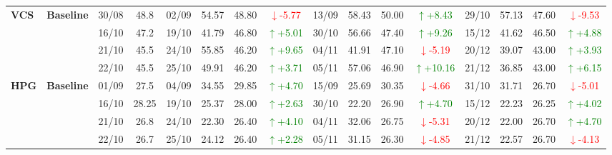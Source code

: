 {\begin{longtable}{llcc|cccc|cccc|cccc}
\multirow{4}{*}{\textbf{VCS}}
& \textbf{Baseline}
& 30/08 & 48.8 & 02/09 & 54.57 & 48.80 & \textcolor{red}{\(\downarrow\)-5.77} & 13/09 & 58.43 & 50.00 & \textcolor{green}{\(\uparrow\)+8.43} & 29/10 & 57.13 & 47.60 & \textcolor{red}{\(\downarrow\)-9.53} \\
& & 16/10 & 47.2 & 19/10 & 41.79 & 46.80 & \textcolor{green}{\(\uparrow\)+5.01} & 30/10 & 56.66 & 47.40 & \textcolor{green}{\(\uparrow\)+9.26} & 15/12 & 41.62 & 46.50 & \textcolor{green}{\(\uparrow\)+4.88} \\
& & 21/10 & 45.5 & 24/10 & 55.85 & 46.20 & \textcolor{green}{\(\uparrow\)+9.65} & 04/11 & 41.91 & 47.10 & \textcolor{red}{\(\downarrow\)-5.19} & 20/12 & 39.07 & 43.00 & \textcolor{green}{\(\uparrow\)+3.93} \\
& & 22/10 & 45.5 & 25/10 & 49.91 & 46.20 & \textcolor{green}{\(\uparrow\)+3.71} & 05/11 & 57.06 & 46.90 & \textcolor{green}{\(\uparrow\)+10.16} & 21/12 & 36.85 & 43.00 & \textcolor{green}{\(\uparrow\)+6.15} \\
\midrule

\multirow{4}{*}{\textbf{HPG}}
& \textbf{Baseline}
& 01/09 & 27.5 & 04/09 & 34.55 & 29.85 & \textcolor{green}{\(\uparrow\)+4.70} & 15/09 & 25.69 & 30.35 & \textcolor{red}{\(\downarrow\)-4.66} & 31/10 & 31.71 & 26.70 & \textcolor{red}{\(\downarrow\)-5.01} \\
& & 16/10 & 28.25 & 19/10 & 25.37 & 28.00 & \textcolor{green}{\(\uparrow\)+2.63} & 30/10 & 22.20 & 26.90 & \textcolor{green}{\(\uparrow\)+4.70} & 15/12 & 22.23 & 26.25 & \textcolor{green}{\(\uparrow\)+4.02} \\
& & 21/10 & 26.8 & 24/10 & 22.30 & 26.40 & \textcolor{green}{\(\uparrow\)+4.10} & 04/11 & 32.06 & 26.75 & \textcolor{red}{\(\downarrow\)-5.31} & 20/12 & 22.00 & 26.70 & \textcolor{green}{\(\uparrow\)+4.70} \\
& & 22/10 & 26.7 & 25/10 & 24.12 & 26.40 & \textcolor{green}{\(\uparrow\)+2.28} & 05/11 & 31.15 & 26.30 & \textcolor{red}{\(\downarrow\)-4.85} & 21/12 & 22.57 & 26.70 & \textcolor{red}{\(\downarrow\)-4.13} \\
\midrule


\end{longtable}}
